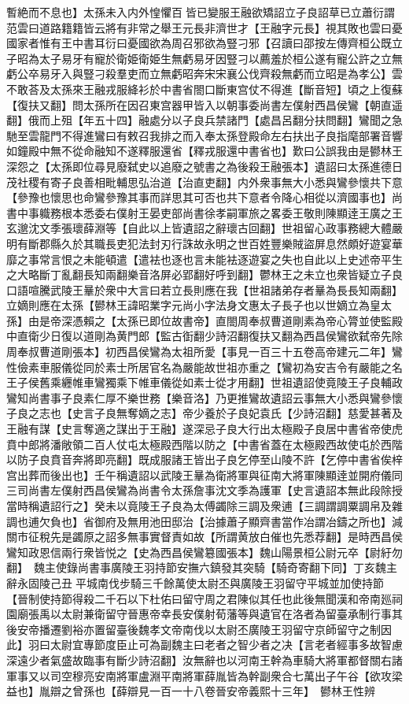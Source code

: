 暫絶而不息也】太孫未入内外惶懼百皆已變服王融欲矯詔立子良詔草已立蕭衍謂范雲曰道路籍籍皆云將有非常之舉王元長非濟世才【王融字元長】視其敗也雲曰憂國家者惟有王中書耳衍曰憂國欲為周召邪欲為豎刁邪【召讀曰邵按左傳齊桓公既立子昭為太子易牙有寵於衛姫衛姫生無虧易牙因豎刁以薦羞於桓公遂有寵公許之立無虧公卒易牙入與豎刁殺羣吏而立無虧昭奔宋宋襄公伐齊殺無虧而立昭是為孝公】雲不敢荅及太孫來王融戎服絳衫於中書省閤口斷東宫仗不得進【斷音短】頃之上復蘇【復扶又翻】問太孫所在因召東宫器甲皆入以朝事委尚書左僕射西昌侯鸞【朝直遥翻】俄而上殂【年五十四】融處分以子良兵禁諸門【處昌呂翻分扶問翻】鸞聞之急馳至雲龍門不得進鸞曰有敕召我排之而入奉太孫登殿命左右扶出子良指麾部署音響如鐘殿中無不從命融知不遂釋服還省【釋戎服還中書省也】歎曰公誤我由是鬰林王深怨之【太孫即位尋見廢弑史以追廢之號書之為後殺王融張本】遺詔曰太孫進德日茂社稷有寄子良善相毗輔思弘治道【治直吏翻】内外衆事無大小悉與鸞參懷共下意【參豫也懷思也命鸞參豫其事而詳思其可否也共下意者令降心相從以濟國事也】尚書中事軄務根本悉委右僕射王晏吏部尚書徐孝嗣軍旅之畧委王敬則陳顯逹王廣之王玄邈沈文季張瓌薛淵等【自此以上皆遺詔之辭瓌古回翻】世祖留心政事務總大體嚴明有斷郡縣久於其職長吏犯法封刃行誅故永明之世百姓豐樂賊盜屏息然頗好遊宴華靡之事常言恨之未能頓遣【遣袪也逐也言未能袪逐遊宴之失也自此以上史述帝平生之大略斷丁亂翻長知兩翻樂音洛屏必郢翻好呼到翻】鬱林王之未立也衆皆疑立子良口語喧騰武陵王曅於衆中大言曰若立長則應在我【世祖諸弟存者曅為長長知兩翻】立嫡則應在太孫【鬰林王諱昭業字元尚小字法身文惠太子長子也以世嫡立為皇太孫】由是帝深憑賴之【太孫已即位故書帝】直閤周奉叔曹道剛素為帝心膂並使監殿中直衛少日復以道剛為黄門郎【監古衘翻少詩沼翻復扶又翻為西昌侯鸞欲弑帝先除周奉叔曹道剛張本】初西昌侯鸞為太祖所愛【事見一百三十五卷高帝建元二年】鸞性儉素車服儀從同於素士所居官名為嚴能故世祖亦重之【鸞初為安吉令有嚴能之名王子侯舊乘纒帷車鸞獨乘下帷車儀從如素士從才用翻】世祖遺詔使竟陵王子良輔政鸞知尚書事子良素仁厚不樂世務【樂音洛】乃更推鸞故遺詔云事無大小悉與鸞參懷子良之志也【史言子良無奪嫡之志】帝少養於子良妃袁氏【少詩沼翻】慈愛甚著及王融有謀【史言奪適之謀出于王融】遂深忌子良大行出太極殿子良居中書省帝使虎賁中郎將潘敞領二百人仗屯太極殿西階以防之【中書省蓋在太極殿西故使屯於西階以防子良賁音奔將即亮翻】既成服諸王皆出子良乞停至山陵不許【乞停中書省俟梓宫出葬而後出也】壬午稱遺詔以武陵王曅為衛將軍與征南大將軍陳顯逹並開府儀同三司尚書左僕射西昌侯鸞為尚書令太孫詹事沈文季為護軍【史言遺詔本無此段除授當時稱遺詔行之】癸未以竟陵王子良為太傅蠲除三調及衆逋【三調謂調粟調帛及雜調也逋欠負也】省御府及無用池田邸治【治據蕭子顯齊書當作冶謂冶鑄之所也】減關市征稅先是蠲原之詔多無事實督責如故【所謂黄放白催也先悉荐翻】是時西昌侯鸞知政恩信兩行衆皆悦之【史為西昌侯鸞簒國張本】魏山陽景桓公尉元卒【尉紆勿翻】　魏主使錄尚書事廣陵王羽持節安撫六鎮發其突騎【騎奇寄翻下同】丁亥魏主辭永固陵己丑平城南伐步騎三千餘萬使太尉丕與廣陵王羽留守平城並加使持節【晉制使持節得殺二千石以下杜佑曰留守周之君陳似其任也此後無聞漢和帝南廵祠園廟張禹以太尉兼衛留守晉惠帝幸長安僕射荀藩等與遺官在洛者為留臺承制行事其後安帝播遷劉裕亦置留臺後魏孝文帝南伐以太尉丕廣陵王羽留守京師留守之制因此】羽曰太尉宜專節度臣止可為副魏主曰老者之智少者之决【言老者經事多故智慮深遠少者氣盛故臨事有斷少詩沼翻】汝無辭也以河南王幹為車騎大將軍都督關右諸軍事又以司空穆亮安南將軍盧淵平南將軍薛胤皆為幹副衆合七萬出子午谷【欲攻梁益也】胤辯之曾孫也【薛辯見一百一十八卷晉安帝義熙十三年】　鬰林王性辨